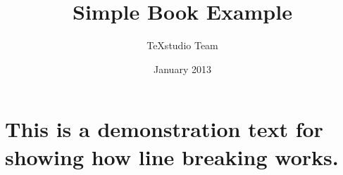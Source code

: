 \documentclass[a4paper,12pt]{book}
\begin{document}
\author{TeXstudio Team}
\title{Simple Book Example}
\date{January 2013}

\frontmatter
\maketitle
\tableofcontents

\mainmatter
\chapter{This is a demonstration text for showing how line breaking works.}

\backmatter
\end{document}
